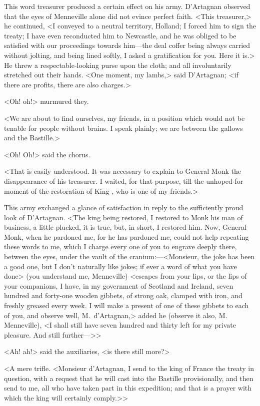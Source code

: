 This word treasurer produced a certain effect on his army. D'Artagnan observed that the eyes of Menneville alone did not evince perfect faith. <This treasurer,> he continued, <I conveyed to a neutral territory, Holland; I forced him to sign the treaty; I have even reconducted him to Newcastle, and he was obliged to be satisfied with our proceedings towards him—the deal coffer being always carried without jolting, and being lined softly, I asked a gratification for you. Here it is.> He threw a respectable-looking purse upon the cloth; and all involuntarily stretched out their hands. <One moment, my lambs,> said D'Artagnan; <if there are profits, there are also charges.>

<Oh! oh!> murmured they.

<We are about to find ourselves, my friends, in a position which would not be tenable for people without brains. I speak plainly; we are between the gallows and the Bastille.>

<Oh! Oh!> said the chorus.

<That is easily understood. It was necessary to explain to General Monk the disappearance of his treasurer. I waited, for that purpose, till the unhoped-for moment of the restoration of King , who is one of my friends.>

This army exchanged a glance of satisfaction in reply to the sufficiently proud look of D'Artagnan. <The king being restored, I restored to Monk his man of business, a little plucked, it is true, but, in short, I restored him. Now, General Monk, when he pardoned me, for he has pardoned me, could not help repeating these words to me, which I charge every one of you to engrave deeply there, between the eyes, under the vault of the cranium:—<Monsieur, the joke has been a good one, but I don't naturally like jokes; if ever a word of what you have done> (you understand me, Menneville) <escapes from your lips, or the lips of your companions, I have, in my government of Scotland and Ireland, seven hundred and forty-one wooden gibbets, of strong oak, clamped with iron, and freshly greased every week. I will make a present of one of these gibbets to each of you, and observe well, M.~d'Artagnan,> added he (observe it also, M.~ Menneville), <I shall still have seven hundred and thirty left for my private pleasure. And still further—>>

<Ah! ah!> said the auxiliaries, <is there still more?>

<A mere trifle. <Monsieur d'Artagnan, I send to the king of France the treaty in question, with a request that he will cast into the Bastille provisionally, and then send to me, all who have taken part in this expedition; and that is a prayer with which the king will certainly comply.>>

